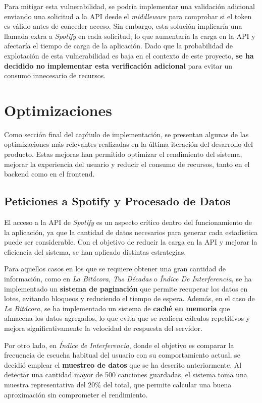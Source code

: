 Para mitigar esta vulnerabilidad, se podría implementar una validación adicional enviando una solicitud a la API desde el \textit{middleware} para comprobar si el token es válido antes de conceder acceso. Sin embargo, esta solución implicaría una llamada extra a \textit{Spotify} en cada solicitud, lo que aumentaría la carga en la API y afectaría el tiempo de carga de la aplicación. Dado que la probabilidad de explotación de esta vulnerabilidad es baja en el contexto de este proyecto, \textbf{se ha decidido no implementar esta verificación adicional} para evitar un consumo innecesario de recursos.

\section{Optimizaciones} \label{sec:optimizaciones}

Como sección final del capítulo de implementación, se presentan algunas de las optimizaciones más relevantes realizadas en la última iteración del desarrollo del producto. Estas mejoras han permitido optimizar el rendimiento del sistema, mejorar la experiencia del usuario y reducir el consumo de recursos, tanto en el backend como en el frontend.

\subsection{Peticiones a Spotify y Procesado de Datos}

El acceso a la API de \textit{Spotify} es un aspecto crítico dentro del funcionamiento de la aplicación, ya que la cantidad de datos necesarios para generar cada estadística puede ser considerable. Con el objetivo de reducir la carga en la API y mejorar la eficiencia del sistema, se han aplicado distintas estrategias.

Para aquellos casos en los que se requiere obtener una gran cantidad de información, como en \textit{La Bitácora}, \textit{Tus Décadas} o \textit{Índice De Interferencia}, se ha implementado un \textbf{sistema de paginación} que permite recuperar los datos en lotes, evitando bloqueos y reduciendo el tiempo de espera. Además, en el caso de \textit{La Bitácora}, se ha implementado un sistema de \textbf{caché en memoria} que almacena los datos agregados, lo que evita que se realicen cálculos repetitivos y mejora significativamente la velocidad de respuesta del servidor.

Por otro lado, en \textit{Índice de Interferencia}, donde el objetivo es comparar la frecuencia de escucha habitual del usuario con su comportamiento actual, se decidió emplear el \textbf{muestreo de datos} que se ha descrito anteriormente. Al detectar una cantidad mayor de 500 canciones guardadas, el sistema toma una muestra representativa del 20\% del total, que permite calcular una buena aproximación sin comprometer el rendimiento.

